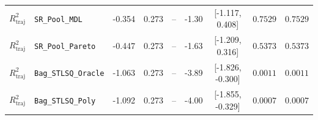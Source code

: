 \begin{table}[t]
\begin{tabular}{llccccccc}
$R^2_{\text{traj}}$ & \texttt{SR\_Pool\_MDL} & -0.354 & 0.273 & -- & -1.30 & [-1.117, 0.408] & $0.7529$ & $0.7529$ \\
$R^2_{\text{traj}}$ & \texttt{SR\_Pool\_Pareto} & -0.447 & 0.273 & -- & -1.63 & [-1.209, 0.316] & $0.5373$ & $0.5373$ \\
$R^2_{\text{traj}}$ & \texttt{Bag\_STLSQ\_Oracle} & -1.063 & 0.273 & -- & -3.89 & [-1.826, -0.300] & $0.0011$ & $0.0011$ \\
$R^2_{\text{traj}}$ & \texttt{Bag\_STLSQ\_Poly} & -1.092 & 0.273 & -- & -4.00 & [-1.855, -0.329] & $0.0007$ & $0.0007$ \\
\bottomrule
\end{tabular}
\end{table}
